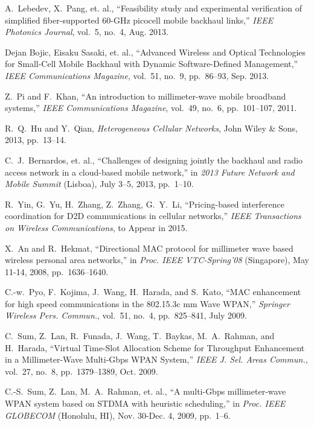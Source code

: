\documentclass[journal]{IEEEtran}
\begin{document}
\begin{thebibliography}{10}
A.~Lebedev, X.~Pang, et. al., ``Feasibility study and experimental verification of simplified
fiber-supported 60-GHz picocell mobile backhaul links,'' \emph{IEEE Photonics Journal}, vol.~5,
no.~4, Aug. 2013.



Dejan Bojic, Eisaku Sasaki, et. al., ``Advanced Wireless and Optical Technologies for Small-Cell
Mobile Backhaul with Dynamic Software-Defined Management,'' \emph{IEEE Communications Magazine},
vol.~51, no.~9, pp.~86--93, Sep. 2013.

Z.~Pi and F.~Khan, ``An introduction to millimeter-wave mobile broadband systems,'' \emph{IEEE Communications Magazine}, vol.~49, no.~6, pp.~101--107, 2011.

R.~Q.~Hu and Y.~Qian, \emph{Heterogeneous Cellular Networks}, John Wiley \& Sons, 2013, pp.~13--14.



C.~J.~Bernardos, et. al., ``Challenges of designing jointly the backhaul and radio access network
in a cloud-based mobile network,'' in \emph{2013 Future Network and Mobile Summit} (Lisboa), July
3--5, 2013, pp.~1--10.


R.~Yin, G.~Yu, H.~Zhang, Z.~Zhang, G.~Y.~Li, ``Pricing-based interference coordination for D2D communications in cellular networks,'' \emph{IEEE Transactions on Wireless Communications}, to Appear in 2015.



 X.~An and R.~Hekmat, ``Directional MAC protocol for millimeter wave based wireless personal area
networks,'' in \emph{Proc. IEEE VTC-Spring'08} (Singapore), May 11-14, 2008, pp.~1636--1640.


 C.-w.~Pyo, F.~Kojima, J.~Wang, H.~Harada, and S.~Kato, ``MAC enhancement for high speed
communications in the 802.15.3c mm Wave WPAN,'' \emph{Springer Wireless Pers. Commun.}, vol.~51,
no.~4, pp.~825--841, July 2009.

 C.~Sum, Z.~Lan, R.~Funada, J.~Wang, T.~Baykas, M.~A.~Rahman, and H.~Harada, ``Virtual Time-Slot
Allocation Scheme for Throughput Enhancement in a Millimeter-Wave Multi-Gbps WPAN System,''
\emph{IEEE J. Sel. Areas Commun.}, vol.~27, no.~8, pp.~1379--1389, Oct. 2009.

 C.-S.~Sum, Z.~Lan, M.~A.~Rahman, et. al., ``A multi-Gbps millimeter-wave WPAN system based on STDMA
with heuristic scheduling,'' in \emph{Proc. IEEE GLOBECOM} (Honolulu, HI), Nov. 30-Dec. 4, 2009,
pp.~1--6.


\end{thebibliography}
\end{document}
